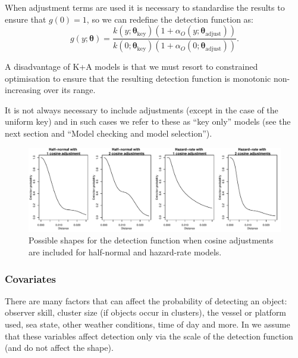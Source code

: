 \documentclass[article,shortnames]{jss}
\begin{document}
When adjustment terms are used it is necessary to standardise the
results to ensure that \(g(0)=1\), so we can redefine the detection
function as: \[
g(y; \boldsymbol{\theta}) = \frac{k(y; \boldsymbol{\theta}_\text{key})\left( 1+ \alpha_O(y; \boldsymbol{\theta}_\text{adjust})\right)}{k(0; \boldsymbol{\theta}_\text{key})\left( 1+ \alpha_O(0; \boldsymbol{\theta}_\text{adjust})\right)}.
\]

A disadvantage of K+A models is that we must resort to constrained
optimisation \citep[via the  package;][]{rsolnp-pkg} to
ensure that the resulting detection function is monotonic non-increasing
over its range.

It is not always necessary to include adjustments (except in the case of
the uniform key) and in such cases we refer to these as ``key only''
models (see the next section and ``Model checking and model
selection'').

\begin{CodeChunk}
\begin{figure}

{\centering \includegraphics{paper_files/figure-latex/adjust-mix-comp-1} 

}

\caption{Possible shapes for the detection function when cosine adjustments are included for half-normal and hazard-rate models.\label{fig:keyadj}}\label{fig:adjust-mix-comp}
\end{figure}
\end{CodeChunk}

\subsubsection{Covariates}\label{covariates}

There are many factors that can affect the probability of detecting an
object: observer skill, cluster size (if objects occur in clusters), the
vessel or platform used, sea state, other weather conditions, time of
day and more. In  we assume that these variables affect
detection only via the scale of the detection function (and do not
affect the shape).
\end{document}
